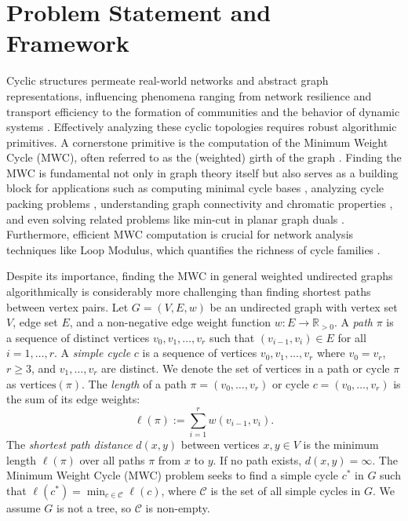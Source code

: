 \documentclass{article}
\begin{document}
\section{Problem Statement and Framework}
\label{sec:intro_framework}

Cyclic structures permeate real-world networks and abstract graph representations, influencing phenomena ranging from network resilience and transport efficiency to the formation of communities and the behavior of dynamic systems \cite{diestel2000graph}. Effectively analyzing these cyclic topologies requires robust algorithmic primitives. A cornerstone primitive is the computation of the Minimum Weight Cycle (MWC), often referred to as the (weighted) girth of the graph \cite{harary1969graph}. Finding the MWC is fundamental not only in graph theory itself but also serves as a building block for applications such as computing minimal cycle bases \cite{gleiss2001circuit, kavitha2004faster, kavitha2007new}, analyzing cycle packing problems \cite{caprara2003packing, krivelevich2005approximation, salavatipour2005disjoint}, understanding graph connectivity and chromatic properties \cite{diestel2000graph, djidjev2000computing}, and even solving related problems like min-cut in planar graph duals \cite{sankowski2011min}. Furthermore, efficient MWC computation is crucial for network analysis techniques like Loop Modulus, which quantifies the richness of cycle families \cite{shakeri2016modulus}.

Despite its importance, finding the MWC in general weighted undirected graphs algorithmically is considerably more challenging than finding shortest paths between vertex pairs. Let $G=(V, E, w)$ be an undirected graph with vertex set $V$, edge set $E$, and a non-negative edge weight function $w: E \to \mathbb{R}_{> 0}$. A \textit{path} $\pi$ is a sequence of distinct vertices $v_0, v_1, \dots, v_r$ such that $(v_{i-1}, v_i) \in E$ for all $i=1, \dots, r$. A \textit{simple cycle} $c$ is a sequence of vertices $v_0, v_1, \dots, v_r$ where $v_0 = v_r$, $r \ge 3$, and $v_1, \dots, v_r$ are distinct. We denote the set of vertices in a path or cycle $\pi$ as $\text{vertices}(\pi)$. The \textit{length} of a path $\pi = (v_0, \dots, v_r)$ or cycle $c = (v_0, \dots, v_r)$ is the sum of its edge weights:
\begin{equation}
\label{eq:length_def}
\ell(\pi) := \sum_{i=1}^r w(v_{i-1}, v_i).
\end{equation}
The \textit{shortest path distance} $d(x, y)$ between vertices $x, y \in V$ is the minimum length $\ell(\pi)$ over all paths $\pi$ from $x$ to $y$. If no path exists, $d(x, y) = \infty$. The Minimum Weight Cycle (MWC) problem seeks to find a simple cycle $c^*$ in $G$ such that $\ell(c^*) = \min_{c \in \mathscr{C}} \ell(c)$, where $\mathscr{C}$ is the set of all simple cycles in $G$. We assume $G$ is not a tree, so $\mathscr{C}$ is non-empty.
\end{document}
